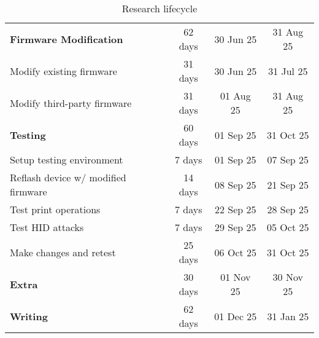 \begin{table}[h]
\begin{tabular}{ |l||c|c|c| }
    \hline
    \hline\rowcolor{gray!10}

    \textbf{Firmware Modification} & 62 days & 30 Jun 25 & 31 Aug 25 \\

    Modify existing firmware & 31 days & 30 Jun 25 & 31 Jul 25 \\
    Modify third-party firmware & 31 days & 01 Aug 25 & 31 Aug 25 \\

    \hline
    \hline\rowcolor{gray!10}

    \textbf{Testing} & 60 days & 01 Sep 25 & 31 Oct 25 \\

    Setup testing environment & 7 days & 01 Sep 25 & 07 Sep 25 \\
    Reflash device w/ modified firmware & 14 days & 08 Sep 25 & 21 Sep 25 \\
    Test print operations & 7 days & 22 Sep 25 & 28 Sep 25 \\
    Test HID attacks & 7 days & 29 Sep 25 & 05 Oct 25 \\
    Make changes and retest & 25 days & 06 Oct 25 & 31 Oct 25 \\

    \hline
    \hline\rowcolor{gray!10}

    \textbf{Extra} & 30 days & 01 Nov 25 & 30 Nov 25 \\
    
    \hline
    \hline\rowcolor{gray!10}

    \textbf{Writing} & 62 days & 01 Dec 25 & 31 Jan 25 \\


    \hline
  \end{tabular}
  \caption{Research lifecycle}
  \label{fig:research_lifecycle}%
\end{table}
